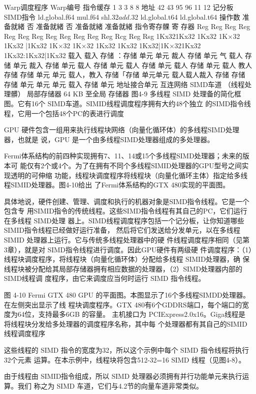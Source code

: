 Warp调度程序
Warp编号
指令缓存
1
3
3
8
8
地址
42
43
95
96
11
12
记分板
SIMD指令
ld.global.f64
mul.f64
shl.$32
add.$32
ld.global.t64
ld.global.t64
操作数
准备就緒
否
准备就緒
否
准备就緒
准备就緒
指令寄存髁
寄
存器
Reg
Reg
Reg
Reg
Reg
Reg
Reg
Reg
Reg
Reg
Reg
Reg
Rcg
Reg
Rsg
1Kx321Kx32 1Kx32 1K×32
1Kx32
|1Kx32 1K×32
1K×32 1Kx32
1Kx32 1Kx32|1K×321Kx32 1Kx32:1Kx32|1Kx32
载入 载入
存储
：存储
单元 单元
裁人
存储
单元
气
载人
存储
单元
裁入
存储
单元
载人
存储
单元
载人
存储
单元
载人
存储
单元
载人
教人
存储
存储
单元 单元
载人，教入
存储「存储
单元单元
载人载人裁入
存储 存储 存储
单元
单元 单元
载入
存储
单元
地址接合单元
互连网络
SIMD车道
（线程处
理髒）
局部存储器
64 KB
至全局
存储器
图4-9
多线程 SIMD 处理备的简化框图。它有16个 SIMD车道。SIMID线程调度程序拥有大约48个独立
的SIMD指令线程，它用一个包括48个PC的表进行调度

GPU 硬件包含一组用来执行线程块网络（向量化循环体）的多线程SIMD处理器，也就是
说，GPU 是一个由多线程SIMD处理器组成的多处理器。

Fermi体系结构的前四种实现拥有7、11、14或15个多线程SIMD处理器；未来的版本可
能仅有2个或4个。为了在拥有不同个多线程SIMID处理器的GPU型号之间实现透明的可伸缩
功能，线程块调度程序将线程块（向量化循环主体）指定给多线程SIMID处理器。图4-10给出
了Fermi体系结构的GTX 480实现的平面图。

具体地说，硬件创建、管理、调度和执行的机器对象是SIMD指令线程。它是一个包含专
用SIMID指令的传统线程。这些SIMD指令线程有其自己的PC，它们运行在多线程 SIMD处理
器上。SIMD线程调度程序包括一个记分板，让你知道哪些SIMID指令线程已经做好运行准备，
然后将它们发送给分发单元，以在多线程SIMID 处理器上运行。它与传统多线程处理器中的硬
件线程调度程序相同（见第3章），就是对 SIMD指令线程进行调度。因此GPU硬件有两级硬
件调度程序：（1）线程块调度程序，将线程块（向量化循环体）分配给多线程 SIMID处理器，确
保线程块被分配给其局部存储器拥有相应数据的处理器，（2）SIMD处理器内部的SIMD线程调
度程序，由它来调度应当何时运行 SIMD 指令线程。


图 4-10
Fermi GTX 480 GPU 的平面图。本图显示了16个多线程SIMDD处理器。在左侧突出显示了线
程块调度程序。GTX 480有6个GDDRS端口，每个端口的宽度为64位，支持最多6GB 的容量。
主机接口为 PCIExpress2.0x16。Giga线程是将线程块分发给多处理器的调度程序名称，其中每
个处理器都有其自己的SIMID线程调度程序

这些线程的 SIMD 指令的宽度为32，所以这个示例中每个 SIMD 指令线程将执行32个元素
运算。在本示例中，线程块将包含512-32=16 SIMD 线程（见图4-8）。

由于线程由 SIMID指令组成，所以 SIMD 处理器必须拥有并行功能单元来执行运算。我们
称之为 SIMD 车道，它们与4.2节的向量车道非常类似。


